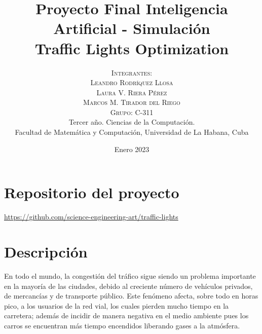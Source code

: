 \documentclass[colorinlistoftodos,twoside,twocolumn]{article} %
\title{\normalsize{Proyecto Final Inteligencia Artificial - Simulaci\'on}\\
	\Huge\bfseries Traffic Lights Optimization\\
} %
\author{%
	\normalsize\textsc{Integrantes:}\\
	\normalsize\textsc{Leandro Rodr\'iquez Llosa}\\
	\normalsize\textsc{Laura V. Riera P\'erez}\\ 
	\normalsize\textsc{Marcos M. Tirador del Riego} \\[2ex]
	\normalsize\textsc{Grupo: C-311} \\[2ex]
	\small Tercer a\~no. Ciencias de la Computaci\'on. \\ %
	\small Facultad de Matem\'atica y Computaci\'on, Universidad de La Habana, Cuba \\ %
}
\date{\footnotesize Enero 2023 } %
\begin{document}
	\maketitle
	
	
	
	\section{Repositorio del proyecto}
	
	\begin{center}
		\href{https://github.com/science-engineering-art/traffic-lights}{https://github.com/science-engineering-art/traffic-lights}
	\end{center}
	
	\section{Descripción}
	
	En todo el mundo, la congestión del tráfico sigue siendo un problema importante en la mayoría de las ciudades, debido al creciente número de vehículos privados,  de mercancías y de transporte público. Este fenómeno afecta, sobre todo en horas pico, a los usuarios de la red vial, los cuales pierden mucho tiempo en la carretera;  además de incidir de manera negativa en el medio ambiente pues los carros se encuentran más tiempo encendidos liberando gases a la atmósfera.
	
\end{document}
